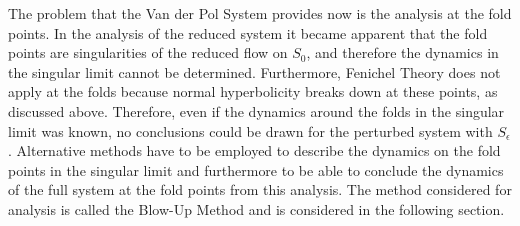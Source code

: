 The problem that the Van der Pol System provides now is the analysis at the fold points.
In the analysis of the reduced system it became apparent that the fold points are singularities of the reduced flow on $S_0$, and therefore the dynamics in the singular limit cannot be determined. Furthermore, Fenichel Theory does not apply at the folds because normal hyperbolicity breaks down at these points, as discussed above. Therefore, even if the dynamics around the folds in the singular limit was known, no conclusions could be drawn for the perturbed system with $S_\epsilon$.
Alternative methods have to be employed to describe the dynamics on the fold points in the singular limit and furthermore to be able to conclude the dynamics of the full system at the fold points from this analysis.
The method considered for analysis is called the Blow-Up Method and is considered in the following section.























 